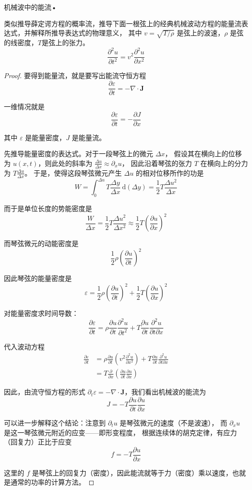 \begin{5}
机械波中的能流•

类似推导薛定谔方程的概率流，推导下面一根弦上的经典机械波动方程的能量流表达式，并解释所推导表达式的物理意义，
其中 $v=\sqrt{T / \rho}$ 是弦上的波速，$\rho$ 是弦的线密度，$T$是弦上的张力。
$$\frac{\partial^2 u}{\partial t^2}=v^2 \frac{\partial^2 u}{\partial x^2}$$
\end{5}
\begin{proof}
要得到能量流，就是要写出能流守恒方程
$$\frac{\partial \varepsilon}{\partial t}=-\nabla \cdot \mathbf{J}$$

一维情况就是
$$\frac{\partial \varepsilon}{\partial t}=-\frac{\partial J}{\partial x}$$

其中 $\varepsilon$ 是能量密度，$J$ 是能量流。

先推导能量密度的表达式。对于一段琴弦上的微元 $\Delta x$，
假设其在横向上的位移为 $u(x, t)$，则此处的斜率为 $\frac{\Delta u}{\Delta x} \approx \partial_{x} u$，
因此沿着琴弦的张力 $T$ 在横向上的分力为 $T \frac{\Delta u}{\Delta x}$。
于是，使得这段琴弦微元产生 $\Delta u$ 的相对位移所作的功是
$$W=\int_{0}^{\Delta u} T \frac{\Delta y}{\Delta x} \mathrm{~d}(\Delta y)
=\frac{1}{2} T \frac{\Delta u^{2}}{\Delta x}$$

而于是单位长度的势能密度是
$$\frac{W}{\Delta x}=\frac{1}{2} T \frac{\Delta u^{2}}{\Delta x^{2}} 
\approx \frac{1}{2} T\left(\frac{\partial u}{\partial x}\right)^{2}$$

而琴弦微元的动能密度是
$$\frac{1}{2} \rho\left(\frac{\partial u}{\partial t}\right)^{2}$$

因此琴弦的能量密度是
$$\varepsilon=\frac{1}{2} \rho\left(\frac{\partial u}{\partial t}\right)^{2}+\frac{1}{2} T\left(\frac{\partial u}{\partial x}\right)^{2}$$

对能量密度求时间导数：
$$\frac{\partial \varepsilon}{\partial t}=\rho \frac{\partial u}{\partial t} \frac{\partial^{2} u}{\partial t^{2}}+T \frac{\partial u}{\partial t} \frac{\partial^{2} u}{\partial t \partial x}$$

代入波动方程
$$
\begin{aligned}
\frac{\partial \varepsilon}{\partial t} & =\rho \frac{\partial u}{\partial t}\left(v^{2} \frac{\partial^{2} u}{\partial x^{2}}\right)+T \frac{\partial u}{\partial t} \frac{\partial^{2} u}{\partial t \partial x} \\
& =T \frac{\partial}{\partial x}\left(\frac{\partial u}{\partial t} \frac{\partial u}{\partial x}\right)
\end{aligned}
$$

因此，由流守恒方程的形式 $\partial_{t} \varepsilon=-\nabla \cdot \mathbf{J}$，我们看出机械波的能流为
$$J=-T \frac{\partial u}{\partial t} \frac{\partial u}{\partial x}$$

可以进一步解释这个结论：注意到 $\partial_{t} u$ 是琴弦微元的速度（不是波速），
而 $\partial_{x} u$ 是这一琴弦微元附近的应变——即形变程度，
根据连续体的胡克定律，有应力（回复力）正比于应变
$$f=-T \frac{\partial u}{\partial x}$$

这里的 $f$ 是琴弦上的回复力（密度），因此能流就等于力（密度）乘以速度，也就是通常的功率的计算方法。
\end{proof}




